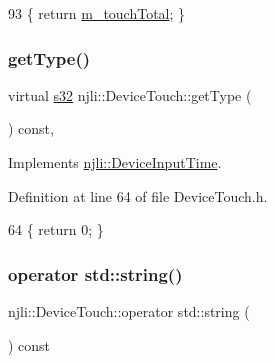 \begin{DoxyCode}
93 \{ \textcolor{keywordflow}{return} \mbox{\hyperlink{classnjli_1_1_device_touch_ad36aeb2b221ff37cf29d6b5f837d0d93}{m\_touchTotal}}; \}
\end{DoxyCode}
\mbox{\label{classnjli_1_1_device_touch_a1920ad95ef19b482f4285c44a1675ee6}} 
\subsubsection{\texorpdfstring{get\+Type()}{getType()}}
{\footnotesize\ttfamily virtual \mbox{\hyperlink{_util_8h_aa62c75d314a0d1f37f79c4b73b2292e2}{s32}} njli\+::\+Device\+Touch\+::get\+Type (\begin{DoxyParamCaption}{ }\end{DoxyParamCaption}) const\hspace{0.3cm}{\ttfamily [inline]}, {\ttfamily [virtual]}}



Implements \mbox{\hyperlink{classnjli_1_1_device_input_time_a69e4bb4be69f3ac53f4514a58fd61021}{njli\+::\+Device\+Input\+Time}}.



Definition at line 64 of file Device\+Touch.\+h.


\begin{DoxyCode}
64 \{ \textcolor{keywordflow}{return} 0; \}
\end{DoxyCode}
\mbox{\label{classnjli_1_1_device_touch_a8992899c7e9e28c7f003c8e1d3e8fe68}} 
\subsubsection{\texorpdfstring{operator std\+::string()}{operator std::string()}}
{\footnotesize\ttfamily njli\+::\+Device\+Touch\+::operator std\+::string (\begin{DoxyParamCaption}{ }\end{DoxyParamCaption}) const\hspace{0.3cm}{\ttfamily [inline]}}




